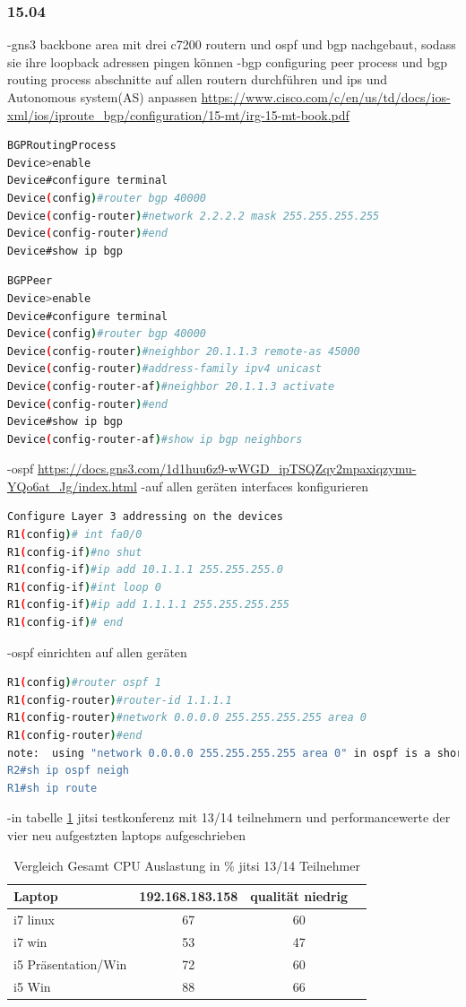 \documentclass[english,runningheads,a4paper]{llncs}[2018/03/10]
\begin{document}
\subsubsection{15.04}
-gns3 backbone area mit drei c7200 routern und ospf und bgp nachgebaut, sodass sie ihre loopback adressen pingen können
-bgp configuring peer process und bgp routing process abschnitte auf allen routern durchführen und ips und Autonomous system(AS) anpassen \url{https://www.cisco.com/c/en/us/td/docs/ios-xml/ios/iproute_bgp/configuration/15-mt/irg-15-mt-book.pdf}
\begin{lstlisting}[language=bash]
BGPRoutingProcess
Device>enable
Device#configure terminal
Device(config)#router bgp 40000
Device(config-router)#network 2.2.2.2 mask 255.255.255.255
Device(config-router)#end
Device#show ip bgp
\end{lstlisting}
\begin{lstlisting}[language=bash]
BGPPeer
Device>enable
Device#configure terminal
Device(config)#router bgp 40000
Device(config-router)#neighbor 20.1.1.3 remote-as 45000
Device(config-router)#address-family ipv4 unicast
Device(config-router-af)#neighbor 20.1.1.3 activate
Device(config-router)#end
Device#show ip bgp
Device(config-router-af)#show ip bgp neighbors
\end{lstlisting}

-ospf \url{https://docs.gns3.com/1d1huu6z9-wWGD_ipTSQZqy2mpaxiqzymu-YQo6at_Jg/index.html}
-auf allen geräten interfaces konfigurieren
\begin{lstlisting}[language=bash]
Configure Layer 3 addressing on the devices
R1(config)# int fa0/0
R1(config-if)#no shut
R1(config-if)#ip add 10.1.1.1 255.255.255.0
R1(config-if)#int loop 0
R1(config-if)#ip add 1.1.1.1 255.255.255.255
R1(config-if)# end
\end{lstlisting}
-ospf einrichten auf allen geräten
\begin{lstlisting}[language=bash]
R1(config)#router ospf 1
R1(config-router)#router-id 1.1.1.1
R1(config-router)#network 0.0.0.0 255.255.255.255 area 0
R1(config-router)#end
note:  using "network 0.0.0.0 255.255.255.255 area 0" in ospf is a shortcut to enable ospf on all interfaces in an ospf area. It's not always desirable in the real world, but is fine for lab purposes
R2#sh ip ospf neigh
R1#sh ip route
\end{lstlisting}
-in tabelle \ref{tab:Jitsi1314} jitsi testkonferenz mit 13/14 teilnehmern und performancewerte der vier neu aufgestzten laptops aufgeschrieben
 \begin{table}
	\caption{Vergleich Gesamt CPU Auslastung in \% jitsi 13/14 Teilnehmer}
	\label{tab:Jitsi1314}
	\centering
	\begin{tabular}{lccc}
		\toprule
		Laptop & 192.168.183.158& qualität niedrig  \\
		\midrule
		i7 linux &67 &60          \\
		i7 win &53 &47           \\
		i5 Präsentation/Win &72 &60        \\
		i5 Win &88 &66        \\ 		
		\bottomrule
	\end{tabular}
\end{table}
\end{document}
